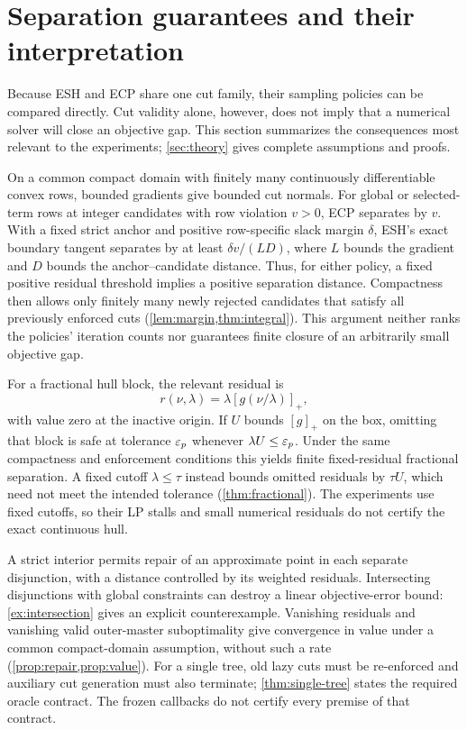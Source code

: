 \section{Separation guarantees and their interpretation}\label{sec:guarantees-overview}
Because ESH and ECP share one cut family, their sampling policies can be compared directly. Cut validity alone, however, does not imply that a numerical solver will close an objective gap. This section summarizes the consequences most relevant to the experiments; \cref{sec:theory} gives complete assumptions and proofs.

On a common compact domain with finitely many continuously differentiable convex rows, bounded gradients give bounded cut normals. For global or selected-term rows at integer candidates with row violation $v>0$, ECP separates by $v$. With a fixed strict anchor and positive row-specific slack margin $\delta$, ESH's exact boundary tangent separates by at least $\delta v/(LD)$, where $L$ bounds the gradient and $D$ bounds the anchor--candidate distance. Thus, for either policy, a fixed positive residual threshold implies a positive separation distance. Compactness then allows only finitely many newly rejected candidates that satisfy all previously enforced cuts (\cref{lem:margin,thm:integral}). This argument neither ranks the policies' iteration counts nor guarantees finite closure of an arbitrarily small objective gap.

For a fractional hull block, the relevant residual is
\[
 r(\nu,\lambda)=\lambda[g(\nu/\lambda)]_+,
\]
with value zero at the inactive origin. If $U$ bounds $[g]_+$ on the box, omitting that block is safe at tolerance $\varepsilon_p$ whenever $\lambda U\le\varepsilon_p$. Under the same compactness and enforcement conditions this yields finite fixed-residual fractional separation. A fixed cutoff $\lambda\le\tau$ instead bounds omitted residuals by $\tau U$, which need not meet the intended tolerance (\cref{thm:fractional}). The experiments use fixed cutoffs, so their LP stalls and small numerical residuals do not certify the exact continuous hull.

A strict interior permits repair of an approximate point in each separate disjunction, with a distance controlled by its weighted residuals. Intersecting disjunctions with global constraints can destroy a linear objective-error bound: \cref{ex:intersection} gives an explicit counterexample. Vanishing residuals and vanishing valid outer-master suboptimality give convergence in value under a common compact-domain assumption, without such a rate (\cref{prop:repair,prop:value}). For a single tree, old lazy cuts must be re-enforced and auxiliary cut generation must also terminate; \cref{thm:single-tree} states the required oracle contract. The frozen callbacks do not certify every premise of that contract.

